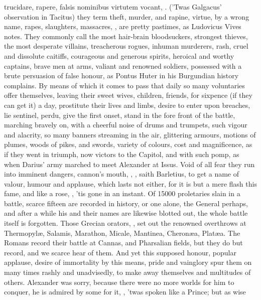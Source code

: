 {{trucidare, rapere, falsis nominibus virtutem vocant}, \etc{}. ('Twas
Galgacus' observation in Tacitus) they term theft, murder, and rapine,
virtue, by a wrong name, rapes, slaughters, massacres, \etc{} , are pretty pastimes, as Ludovicus Vives notes. They
commonly call the most hair-brain bloodsuckers, strongest thieves, the
most desperate villains, treacherous rogues, inhuman murderers, rash,
cruel and dissolute caitiffs, courageous and generous spirits, heroical
and worthy captains, brave men at arms, valiant and renowned
soldiers, possessed with a brute persuasion of false honour, as Pontus
Huter in his Burgundian history complains. By means of which it comes
to pass that daily so many voluntaries offer themselves, leaving their
sweet wives, children, friends, for sixpence (if they can get it) a
day, prostitute their lives and limbs, desire to enter upon breaches,
lie sentinel, perdu, give the first onset, stand in the fore front of
the battle, marching bravely on, with a cheerful noise of drums and
trumpets, such vigour and alacrity, so many banners streaming in the
air, glittering armours, motions of plumes, woods of pikes, and swords,
variety of colours, cost and magnificence, as if they went in triumph,
now victors to the Capitol, and with such pomp, as when Darius' army
marched to meet Alexander at Issus. Void of all fear they run into
imminent dangers, cannon's mouth, \etc{}, , saith Barletius, to get a name of valour, humour
and applause, which lasts not either, for it is but a mere flash this
fame, and like a rose, , 'tis gone in an
instant. Of 15\thinspace{}000 proletaries slain in a battle, scarce fifteen are
recorded in history, or one alone, the General perhaps, and after a
while his and their names are likewise blotted out, the whole battle
itself is forgotten. Those Grecian orators, , set out the renowned overthrows at Thermopyl\ae{}, Salamis,
Marathon, Micale, Mantinea, Cheron\ae{}a, Plat\ae{}a. The Romans record their
battle at Cannas, and Pharsalian fields, but they do but record, and we
scarce hear of them. And yet this supposed honour, popular applause,
desire of immortality by this means, pride and vainglory spur them on
many times rashly and unadvisedly, to make away themselves and
multitudes of others. Alexander was sorry, because there were no more
worlds for him to conquer, he is admired by some for it, , 'twas spoken like a Prince; but as wise \Seneca
}

